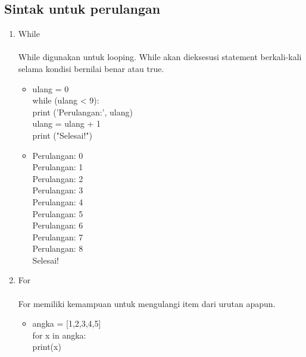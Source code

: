 \documentclass{article}
\begin{document}
    \subsection{Sintak untuk perulangan}
        \begin{enumerate}
            \item While
                \paragraph{}While digunakan untuk looping. While akan dieksesusi statement berkali-kali selama kondisi bernilai benar atau true.
                \begin{itemize}
                    \item   ulang = 0\\
                            while (ulang < 9):\\
                                print ('Perulangan:', ulang)\\
                                ulang = ulang + 1\\
                            
                            print ("Selesai!")\\
                    \item   Perulangan: 0\\
                            Perulangan: 1\\
                            Perulangan: 2\\
                            Perulangan: 3\\
                            Perulangan: 4\\
                            Perulangan: 5\\
                            Perulangan: 6\\
                            Perulangan: 7\\
                            Perulangan: 8\\
                            Selesai!
                \end{itemize}
            \item For 
                \paragraph{}For memiliki kemampuan untuk mengulangi item dari urutan apapun.
                    \begin{itemize}
                        \item   angka = [1,2,3,4,5]\\
                                for x in angka:\\
                                    print(x)\\
                                

\end{itemize}
\end{enumerate}
\end{document}
